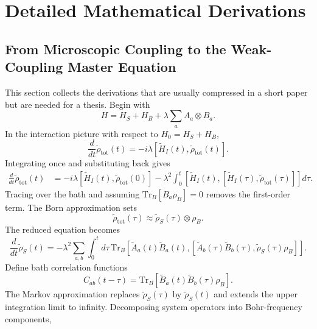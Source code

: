 \documentclass[11pt]{article}
\begin{document}
\clearpage
\section{Detailed Mathematical Derivations}

\subsection{From Microscopic Coupling to the Weak-Coupling Master Equation}

This section collects the derivations that are usually compressed in a short paper but are
needed for a thesis.  Begin with
\begin{equation}
    H=H_S+H_B+\lambda\sum_a A_a\otimes B_a .
\end{equation}
In the interaction picture with respect to $H_0=H_S+H_B$,
\begin{equation}
    \frac{d}{dt}\tilde\rho_{\mathrm{tot}}(t)
    =
    -i\lambda[\tilde H_I(t),\tilde\rho_{\mathrm{tot}}(t)].
\end{equation}
Integrating once and substituting back gives
\begin{align}
    \frac{d}{dt}\tilde\rho_{\mathrm{tot}}(t)
    &=
    -i\lambda[\tilde H_I(t),\tilde\rho_{\mathrm{tot}}(0)]
    -
    \lambda^2
    \int_0^t
    [\tilde H_I(t),[\tilde H_I(\tau),\tilde\rho_{\mathrm{tot}}(\tau)]]
    d\tau .
\end{align}
Tracing over the bath and assuming $\mathrm{Tr}_B[B_a\rho_B]=0$ removes the first-order
term.  The Born approximation sets
\begin{equation}
    \tilde\rho_{\mathrm{tot}}(\tau)
    \approx
    \tilde\rho_S(\tau)\otimes\rho_B .
\end{equation}
The reduced equation becomes
\begin{equation}
    \frac{d}{dt}\tilde\rho_S(t)
    =
    -\lambda^2
    \sum_{a,b}
    \int_0^t
    d\tau\,
    \mathrm{Tr}_B
    \left[
        \tilde A_a(t)\tilde B_a(t),
        [\tilde A_b(\tau)\tilde B_b(\tau),\tilde\rho_S(\tau)\rho_B]
    \right].
\end{equation}
Define bath correlation functions
\begin{equation}
    C_{ab}(t-\tau)
    =
    \mathrm{Tr}_B[
        \tilde B_a(t)\tilde B_b(\tau)\rho_B
    ] .
\end{equation}
The Markov approximation replaces $\tilde\rho_S(\tau)$ by $\tilde\rho_S(t)$ and extends the
upper integration limit to infinity.  Decomposing system operators into Bohr-frequency
components,
\end{document}
